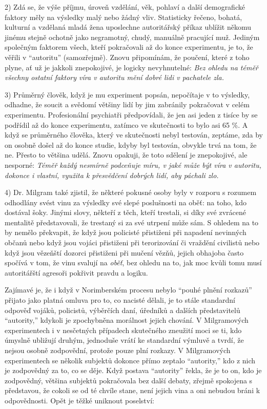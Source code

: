 \documentclass{book}
\begin{document}
2) Zdá se, že výše příjmu, úroveň vzdělání, věk, pohlaví a další demografické faktory měly na výsledky malý nebo žádný vliv. Statisticky řečeno, bohatá, kulturní a vzdělaná mladá žena uposlechne autoritářský příkaz ublížit někomu jinému stejně ochotně jako negramotný, chudý, manuálně pracující muž. Jediným společným faktorem všech, kteří pokračovali až do konce experimentu, je to, že věřili v \enquote{autoritu} (samozřejmě). Znovu připomínám, že poučení, které z toho plyne, ať už je jakkoli znepokojivé, je logicky nevyhnutelné: \emph{Bez ohledu na téměř všechny ostatní faktory víra v autoritu mění dobré lidi v pachatele zla.}

3) Průměrný člověk, když je mu experiment popsán, nepočítaje v to výsledky, odhadne, že soucit a svědomí většiny lidí by jim zabránily pokračovat v celém experimentu. Profesionální psychiatři předpovídali, že jen asi jeden z tisíce by se podřídil až do konce experimentu, zatímco ve skutečnosti to bylo asi 65 \%. A když se průměrného člověka, který ve skutečnosti nebyl testován, zeptáme, zda by on osobně došel až do konce studie, kdyby byl testován, obvykle trvá na tom, že ne. Přesto to většina udělá. Znovu opakuji, že toto sdělení je znepokojivé, ale nesporné: \emph{Téměř každý nesmírně podceňuje míru, v jaké může být víra v autoritu, dokonce i vlastní, využita k přesvědčení dobrých lidí, aby páchali zlo.}

4) Dr. Milgram také zjistil, že některé pokusné osoby byly v rozporu s rozumem odhodlány svést vinu za výsledky své slepé poslušnosti na oběť: na toho, kdo dostával šoky. Jinými slovy, někteří z těch, kteří trestali, si díky své zvrácené mentalitě představovali, že trestaný si za své utrpení může sám. S ohledem na to by nemělo překvapit, že když jsou policisté přistiženi při napadení nevinných občanů nebo když jsou vojáci přistiženi při terorizování či vraždění civilistů nebo když jsou vězeňští dozorci přistiženi při mučení vězňů, jejich obhajoba často spočívá v tom, že vinu svalují na \emph{oběť}, bez ohledu na to, jak moc kvůli tomu musí autoritářští agresoři pokřivit pravdu a logiku.

Zajímavé je, že i když v Norimberském procesu nebylo \enquote{pouhé plnění rozkazů} přijato jako platná omluva pro to, co nacisté dělali, je to stále standardní odpověď vojáků, policistů, výběrčích daní, úředníků a dalších představitelů \enquote{autority,} kdykoli je zpochybněna morálnost jejich chování. V Milgramových experimentech i v nesčetných případech skutečného zneužití moci se ti, kdo úmyslně ubližují druhým, jednoduše vrátí ke standardní výmluvě a tvrdí, že nejsou osobně zodpovědní, protože pouze plní rozkazy. V Milgramových experimentech se několik subjektů dokonce přímo zeptalo \enquote{autority,} kdo z nich je zodpovědný za to, co se děje. Když postava \enquote{autority} řekla, že je to on, kdo je zodpovědný, většina subjektů pokračovala bez další debaty, zřejmě spokojena s představou, že cokoli se od té chvíle stane, není jejich vina a oni nebudou bráni k odpovědnosti. Opět je těžké uniknout poselství:
\end{document}
